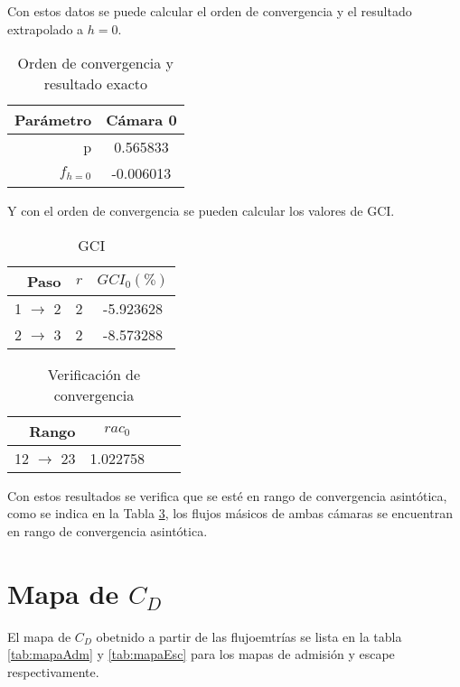 Con estos datos se puede calcular el orden de convergencia y el resultado
extrapolado a $h=0$.

\begin{table}[h]
    \centering
    \begin{tabular}{rc}\toprule
        Parámetro & Cámara 0  \\ \midrule
        p         &  0.565833 \\
        $f_{h=0}$ & -0.006013 \\ \bottomrule
    \end{tabular}
    \caption{Orden de convergencia y resultado exacto}
    \label{tab:res1_caso5}
\end{table}

Y con el orden de convergencia se pueden calcular los valores de GCI.

\begin{table}
    \centering
    \begin{tabular}{rcc}\toprule
        Paso              & $r$ & $GCI_0(\%)$ \\ \midrule
        1 $\rightarrow$ 2 & 2   & -5.923628   \\
        2 $\rightarrow$ 3 & 2   & -8.573288   \\ \bottomrule
    \end{tabular}
    \caption{GCI}
    \label{tab:gci_caso_5}
\end{table}

\begin{table}
    \centering
    \begin{tabular}{rccc}\toprule
        Rango               & $rac_0$  \\ \midrule
        12 $\rightarrow$ 23 & 1.022758 \\ \bottomrule
    \end{tabular}
    \caption{Verificación de convergencia}
    \label{tab:rac_caso_5}
\end{table}

Con estos resultados se verifica que se esté en rango de convergencia
asintótica, como se indica en la Tabla \ref{tab:rac_caso_5}, los flujos
másicos de ambas cámaras se encuentran en rango de convergencia asintótica.


\section{Mapa de $C_D$}
%
El mapa de $C_D$ obetnido a partir de las flujoemtrías se lista en la tabla
\ref{tab:mapaAdm} y \ref{tab:mapaEsc} para los mapas de admisión y escape
respectivamente.


